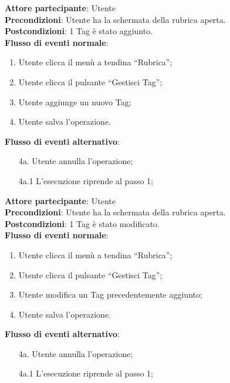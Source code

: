 \begin{tcolorbox}[colback=white,colframe=black!80!white,title=\textbf{C9 - Aggiungere Tag}]
	\textbf{Attore partecipante}: Utente
	\\\textbf{Precondizioni}: Utente ha la schermata della rubrica aperta.
	\\\textbf{Postcondizioni}: 1 Tag è stato aggiunto.
	\\\textbf{Flusso di eventi normale}:
	\begin{enumerate}[noitemsep, topsep=0pt]
		\item Utente clicca il menù a tendina “Rubrica”;
	\item	Utente clicca il pulsante “Gestisci Tag”;
	\item	Utente aggiunge un nuovo Tag;
	\item	Utente salva l’operazione.		
	\end{enumerate}
	\textbf{Flusso di eventi alternativo}:
	\begin{itemize}[noitemsep, topsep=0pt]
		\item[4a. ] Utente annulla l’operazione;
		\item[4a.1] L’esecuzione riprende al passo 1;		
	\end{itemize}
\end{tcolorbox}

\begin{tcolorbox}[colback=white,colframe=black!80!white,title=\textbf{C10 - Modificare Tag}]
	\textbf{Attore partecipante}: Utente
	\\\textbf{Precondizioni}: Utente ha la schermata della rubrica aperta. 
	\\\textbf{Postcondizioni}: 1 Tag è stato modificato.
	\\\textbf{Flusso di eventi normale}:
	\begin{enumerate}[noitemsep, topsep=0pt]
		\item Utente clicca il menù a tendina “Rubrica”;
		\item Utente clicca il pulsante “Gestisci Tag”;
	\item 	Utente modifica un Tag precedentemente aggiunto;
	\item 	Utente salva l’operazione.		
	\end{enumerate}
	\textbf{Flusso di eventi alternativo}:
	\begin{itemize}[noitemsep, topsep=0pt]
		\item[4a. ] Utente annulla l’operazione;
		\item[4a.1] L’esecuzione riprende al passo 1;		
	\end{itemize}
\end{tcolorbox}

